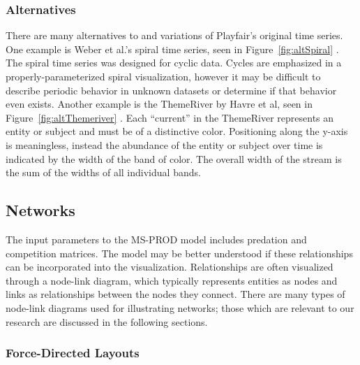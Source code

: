 \subsubsection{Alternatives}

There are many alternatives to and variations of Playfair's original time series.  One example is Weber et al.'s spiral time series, seen in Figure~\ref{fig:altSpiral} \citeyearpar{weber2001}.  The spiral time series was designed for cyclic data.  Cycles are emphasized in a properly-parameterized spiral visualization, however it may be difficult to describe periodic behavior in unknown datasets or determine if that behavior even exists. Another example is the ThemeRiver by Havre et al, seen in Figure~\ref{fig:altThemeriver} \citeyearpar{havre2000}.  Each ``current'' in the ThemeRiver represents an entity or subject and must be of a distinctive color.  Positioning along the y-axis is meaningless, instead the abundance of the entity or subject over time is indicated by the width of the band of color.  The overall width of the stream is the sum of the widths of all individual bands. 

\subsection{Networks}

The input parameters to the MS-PROD model includes predation and competition matrices.  The model may be better understood if these relationships can be incorporated into the visualization. Relationships are often visualized through a node-link diagram, which typically represents entities as nodes and links as relationships between the nodes they connect.  There are many types of node-link diagrams used for illustrating networks; those which are relevant to our research are discussed in the following sections.

\subsubsection{Force-Directed Layouts}

